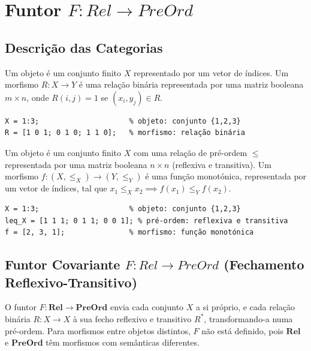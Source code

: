 \section{Funtor $F: Rel \to PreOrd$}
\label{sec:functor-rel-preord}

\subsection{Descrição das Categorias}

\begin{definition}
Um objeto é um conjunto finito $X$ representado por um vetor de índices. Um morfismo $R: X \to Y$ é uma relação binária representada por uma matriz booleana $m \times n$, onde $R(i,j) = 1$ se $(x_i, y_j) \in R$.
\end{definition}

\begin{lstlisting}[style=matlab, caption={Objeto e morfismo em $\mathbf{Rel}$}]
X = 1:3;                     % objeto: conjunto {1,2,3}
R = [1 0 1; 0 1 0; 1 1 0];   % morfismo: relação binária
\end{lstlisting}

\begin{definition}
Um objeto é um conjunto finito $X$ com uma relação de pré-ordem $\leq$ representada por uma matriz booleana $n \times n$ (reflexiva e transitiva). Um morfismo $f: (X, \leq_X) \to (Y, \leq_Y)$ é uma função monotónica, representada por um vetor de índices, tal que $x_1 \leq_X x_2 \implies f(x_1) \leq_Y f(x_2)$.
\end{definition}

\begin{lstlisting}[style=matlab, caption={Objeto e morfismo em $\mathbf{PreOrd}$}]
X = 1:3;                     % objeto: conjunto {1,2,3}
leq_X = [1 1 1; 0 1 1; 0 0 1]; % pré-ordem: reflexiva e transitiva
f = [2, 3, 1];               % morfismo: função monotónica
\end{lstlisting}

\subsection{Funtor Covariante $F: Rel \to PreOrd$ (Fechamento Reflexivo-Transitivo)}

O funtor $F: \mathbf{Rel} \to \mathbf{PreOrd}$ envia cada conjunto $X$ a si próprio, e cada relação binária $R: X \to X$ à sua fecho reflexivo e transitivo $R^*$, transformando-a numa pré-ordem. Para morfismos entre objetos distintos, $F$ não está definido, pois $\mathbf{Rel}$ e $\mathbf{PreOrd}$ têm morfismos com semânticas diferentes.

